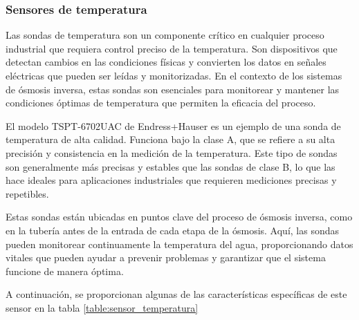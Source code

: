 \subsubsection{Sensores de temperatura} \label{sec:sensor_temp}

Las sondas de temperatura son un componente crítico en cualquier proceso industrial que requiera control preciso
de la temperatura. Son dispositivos que detectan cambios en las condiciones físicas y convierten los datos en
señales eléctricas que pueden ser leídas y monitorizadas. En el contexto de los sistemas de ósmosis inversa,
estas sondas son esenciales para monitorear y mantener las condiciones óptimas de temperatura que permiten la
eficacia del proceso.

El modelo TSPT-6702UAC de Endress+Hauser es un ejemplo de una sonda de temperatura de alta calidad. Funciona bajo
la clase A, que se refiere a su alta precisión y consistencia en la medición de la temperatura.
Este tipo de sondas son generalmente más precisas y estables que las sondas de clase B, lo que
las hace ideales para aplicaciones industriales que requieren mediciones precisas y repetibles.

Estas sondas están ubicadas en puntos clave del proceso de ósmosis inversa, como en la tubería antes de la
entrada de cada etapa de la ósmosis. Aquí, las sondas pueden monitorear continuamente la temperatura del agua,
proporcionando datos vitales que pueden ayudar a prevenir problemas y garantizar que el sistema funcione de manera óptima.



A continuación, se proporcionan algunas de las características específicas de este sensor en la tabla \ref{table:sensor_temperatura}\\


